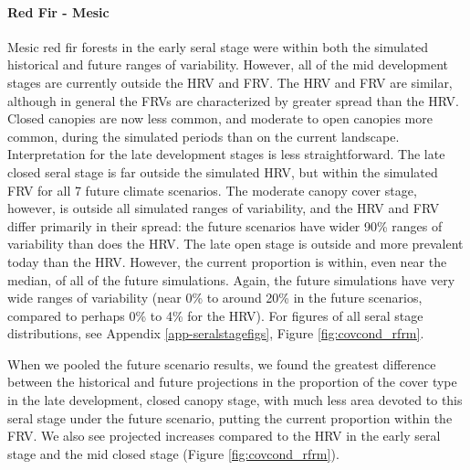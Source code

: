 \documentclass[12pt]{article}
\begin{document}
\begin{spacing}{1}
\paragraph{Red Fir - Mesic} Mesic red fir forests in the early seral stage were within both the simulated historical and future ranges of variability. However, all of the mid development stages are currently outside the HRV and FRV. The HRV and FRV are similar, although in general the FRVs are characterized by greater spread than the HRV. Closed canopies are now less common, and moderate to open canopies more common, during the simulated periods than on the current landscape. Interpretation for the late development stages is less straightforward. The late closed seral stage is far outside the simulated HRV, but within the simulated FRV for all 7 future climate scenarios. The moderate canopy cover stage, however, is outside all simulated ranges of variability, and the HRV and FRV differ primarily in their spread: the future scenarios have wider 90\% ranges of variability than does the HRV. The late open stage is outside and more prevalent today than the HRV. However, the current proportion is within, even near the median, of all of the future simulations. Again, the future simulations have very wide ranges of variability (near 0\% to around 20\% in the future scenarios, compared to perhaps 0\% to 4\% for the HRV). For figures of all seral stage distributions, see Appendix \ref{app-seralstagefigs}, Figure \ref{fig:covcond_rfrm}.

When we pooled the future scenario results, we found the greatest difference between the historical and future projections in the proportion of the cover type in the late development, closed canopy stage, with much less area devoted to this seral stage under the future scenario, putting the current proportion within the FRV. We also see projected increases compared to the HRV in the early seral stage and the mid closed stage (Figure \ref{fig:covcond_rfrm}).


\end{spacing}
\end{document}
